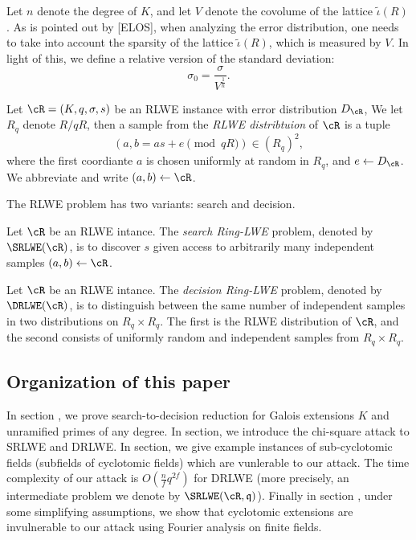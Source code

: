 \documentclass{amsart}
\begin{document}
Let $n$ denote the degree of $K$, and let $V$ denote the covolume of the lattice $\tilde{\iota}(R)$. As is pointed out by [ELOS], when analyzing the error distribution, one needs to take into account the sparsity of the lattice $\tilde{\iota}(R)$, which is measured by $V$. In light of this, we define a relative version of the standard deviation: $$\sigma_0 = \frac{\sigma}{V^{\frac{1}{n}}}.$$

\begin{Definition}
Let $\cR = (K,q,\sigma, s)$ be an RLWE instance with error distribution $D_\cR$, We let $R_q$ denote $R/qR$, then
a sample from the {\it RLWE distribtuion} of $\cR$ is a tuple
$$(a, b = as+e\pmod{qR}) \in (R_q)^2, $$
where the first coordiante $a$ is chosen uniformly at random in $R_q$, and $e \gets D_\cR$. We abbreviate and write $(a,b) \gets \cR$.
\end{Definition}

The RLWE problem has two variants: search and decision.

\begin{Definition}[Search]
Let $\cR$ be an RLWE intance. The {\it search Ring-LWE} problem, denoted by $\SRLWE(\cR)$, is to discover $s$ given access to arbitrarily many independent samples $(a,b) \gets \cR$.
\end{Definition}

\begin{Definition}[Decision]
Let $\cR$ be an RLWE intance. The {\it decision Ring-LWE}
problem, denoted by $\DRLWE(\cR)$, is to distinguish between the same number of independent samples in two distributions on $R_q \times R_q$. The first is the RLWE distribution of $\cR$, and the second consists of uniformly random and independent samples from $R_q \times R_q$.
\end{Definition}


\subsection{Organization of this paper}

In section , we prove search-to-decision reduction for Galois extensions $K$ and unramified primes of any degree.
In section, we introduce the chi-square attack to SRLWE and DRLWE. In section, we give example instances of sub-cyclotomic fields (subfields of cyclotomic fields) which are vunlerable to our attack. The time complexity of our attack is $O(\frac{n}{f}q^{2f})$ for DRLWE (more precisely, an intermediate problem we denote by $\SRLWE(\cR,\fq)$). Finally in section , under some simplifying assumptions, we show that cyclotomic extensions are invulnerable to our attack using Fourier analysis on finite fields.
\end{document}
